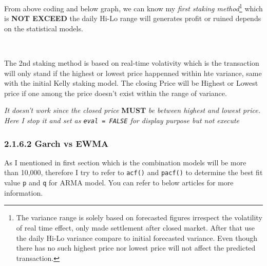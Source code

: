 \documentclass[]{tufte-book}
\begin{document}
From above coding and below graph, we can know my \emph{first staking
method}\footnote{The variance range is solely based on forecasted
  figures irrespect the volatility of real time effect, only made
  settlement after closed market. After that use the daily Hi-Lo
  variance compare to initial forecasted variance. Even though there has
  no such highest price nor lowest price will not affect the predicted
  transaction.} which is \textbf{NOT EXCEED} the daily Hi-Lo range will
generates profit or ruined depends on the statistical models.

\\

\hypertarget{LineChartID54301e38a5}{}

The 2nd staking method is based on real-time volativity which is the
transaction will only stand if the highest or lowest price happenned
within hte variance, same with the initial Kelly staking model. The
closing Price will be Highest or Lowest price if one among the price
doesn't exist within the range of variance.

{\emph{It doesn't work since the closed price} \textbf{MUST} \emph{be
between highest and lowest price. Here I stop it and set as
\texttt{eval\ =\ FALSE} for display purpose but not execute}}

\subsubsection{2.1.6.2 Garch vs EWMA}\label{garch-vs-ewma-4}

As I mentioned in first section which is the combination models will be
more than 10,000, therefore I try to refer to \texttt{acf()} and
\texttt{pacf()} to determine the best fit value \texttt{p} and
\texttt{q} for ARMA model. You can refer to below articles for more
information.
\end{document}
